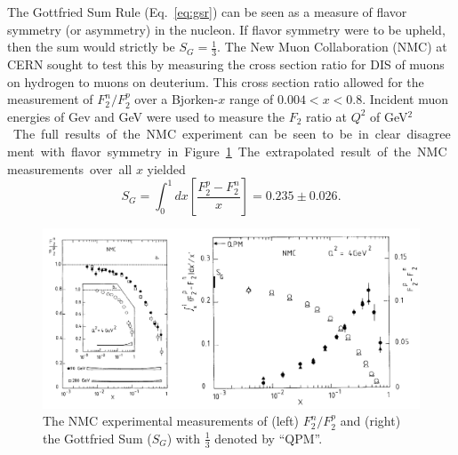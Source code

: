 The Gottfried Sum Rule (Eq.~\ref{eq:gsr}) can be seen as a measure of flavor symmetry (or asymmetry) in the nucleon. If flavor symmetry were to be upheld, then the sum would strictly be $S_G = \frac{1}{3}$. The New Muon Collaboration (NMC) at CERN sought to test this by measuring the cross section ratio for DIS of muons on hydrogen to muons on deuterium\cite{Amaudruz:1991nw,Arneodo:1994sh}. This cross section ratio allowed for the measurement of $F_2^n/F_2^p$ over a Bjorken-$x$ range of $0.004 < x < 0.8$.  Incident muon energies of \unit[90]{Gev} and \unit[280]{GeV} were used to measure the $F_2$ ratio at $Q^2$ of \unit[4]{GeV$^2$}. The full results of the NMC experiment can be seen to be in clear disagreement with flavor symmetry in Figure~\ref{fig:nmc}. The extrapolated result of the NMC measurements over all $x$ yielded
\begin{equation}
S_G = \int_0^1 dx \left[ \frac{F_2^p - F_2^n}{x} \right] = 0.235 \pm 0.026.
\end{equation}

\begin{figure}
	\centering
	\includegraphics[width=\textwidth]{figures/background/NMC-All.pdf}
	\caption{The NMC experimental measurements of (left) $F_2^n/F_2^p$ and (right) the Gottfried Sum ($S_G$) with $\frac{1}{3}$ denoted by ``QPM''.}
	\label{fig:nmc}
\end{figure}

